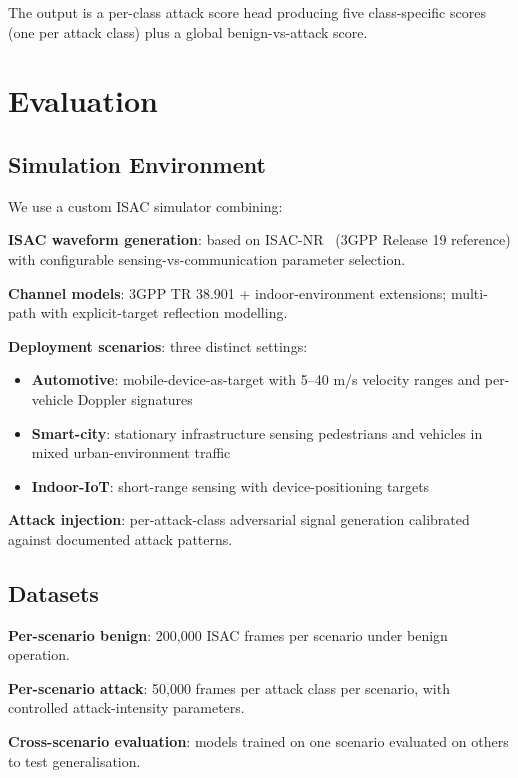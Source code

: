 \documentclass[sigconf,nonacm]{acmart}
\begin{document}
The output is a per-class attack score head producing five
class-specific scores (one per attack class) plus a global
benign-vs-attack score.

\section{Evaluation}

\subsection{Simulation Environment}

We use a custom ISAC simulator combining:

\textbf{ISAC waveform generation}: based on
ISAC-NR~\cite{liu2024isac} (3GPP Release 19 reference) with
configurable sensing-vs-communication parameter selection.

\textbf{Channel models}: 3GPP TR 38.901 + indoor-environment
extensions; multi-path with explicit-target reflection
modelling.

\textbf{Deployment scenarios}: three distinct settings:
\begin{itemize}
  \item \textbf{Automotive}: mobile-device-as-target with 5--40
        m/s velocity ranges and per-vehicle Doppler signatures
  \item \textbf{Smart-city}: stationary infrastructure sensing
        pedestrians and vehicles in mixed urban-environment
        traffic
  \item \textbf{Indoor-IoT}: short-range sensing with
        device-positioning targets
\end{itemize}

\textbf{Attack injection}: per-attack-class adversarial signal
generation calibrated against documented attack patterns.

\subsection{Datasets}

\textbf{Per-scenario benign}: 200{,}000 ISAC frames per scenario
under benign operation.

\textbf{Per-scenario attack}: 50{,}000 frames per attack class per
scenario, with controlled attack-intensity parameters.

\textbf{Cross-scenario evaluation}: models trained on one
scenario evaluated on others to test generalisation.
\end{document}
